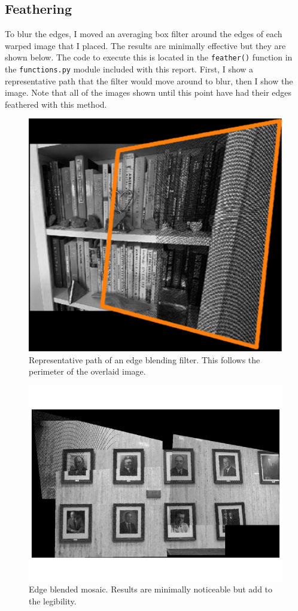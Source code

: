 \documentclass[]{article}
\begin{document}
	\subsection{Feathering}
	To blur the edges, I moved an averaging box filter around the edges of each warped image that I placed. The results are minimally effective but they are shown below. The code to execute this is located in the \texttt{feather()} function in the \texttt{functions.py} module included with this report. First, I show a representative path that the filter would move around to blur, then I show the image. Note that all of the images shown until this point have had their edges feathered with this method. 
	\begin{figure}[H]
		\centering
		\includegraphics[width=4.5in]{test_images/shelf_10_orange.png}
		\caption{Representative path of an edge blending filter. This follows the perimeter of the overlaid image.}
	\end{figure}

	\begin{figure}[H]
		\centering
		\includegraphics[width=6.5in]{test_images/example_raw.png}
		\caption{Edge blended mosaic. Results are minimally noticeable but add to the legibility.}
	\end{figure}
	
\end{document}
